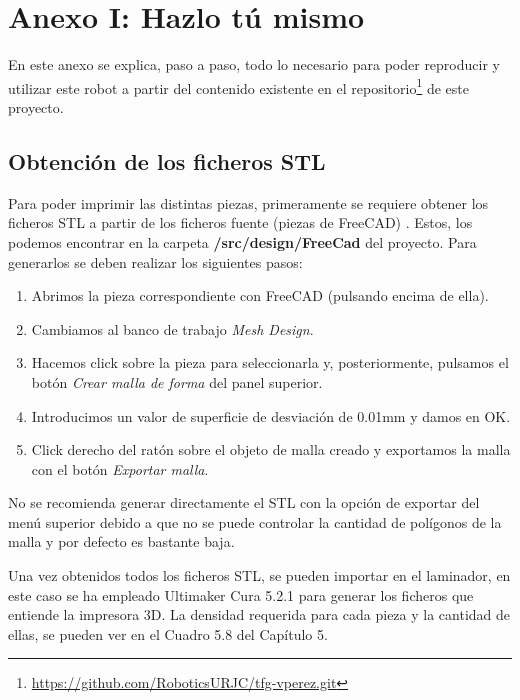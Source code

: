 \chapter*{Anexo I: Hazlo tú mismo}
\label{cap:anexoi}

\noindent En este anexo se explica, paso a paso, todo lo necesario para poder reproducir y utilizar este robot a partir del contenido 
existente en el repositorio\footnote{\url{https://github.com/RoboticsURJC/tfg-vperez.git}} de este proyecto.

\section*{Obtención de los ficheros STL}
\noindent Para poder imprimir las distintas piezas, primeramente se requiere obtener los ficheros STL a partir de los ficheros fuente (piezas de FreeCAD) . 
Estos, los podemos encontrar en la carpeta \textbf{/src/design/FreeCad} del proyecto. Para generarlos se deben realizar los siguientes pasos:
\begin{enumerate}
\item Abrimos la pieza correspondiente con FreeCAD (pulsando encima de ella).
\item Cambiamos al banco de trabajo \textit{Mesh Design}.
\item Hacemos click sobre la pieza para seleccionarla y, posteriormente, pulsamos el botón \textit{Crear malla de forma} del panel superior.
\item Introducimos un valor de superficie de desviación de 0.01mm y damos en OK.
\item Click derecho del ratón sobre el objeto de malla creado y exportamos la malla con el botón \textit{Exportar malla}. 
\end{enumerate}

\begin{tcolorbox}[colback=blue!5!white,colframe=blue!75!black,title=Nota]
    No se recomienda generar directamente el STL con la opción de exportar del menú superior debido a que no se puede controlar la cantidad de polígonos 
    de la malla y por defecto es bastante baja.
\end{tcolorbox}

Una vez obtenidos todos los ficheros STL, se pueden importar en el laminador, en este caso se ha empleado 
Ultimaker Cura 5.2.1 para generar los ficheros que entiende la impresora 3D. La densidad requerida para cada pieza 
y la cantidad de ellas, se pueden ver en el Cuadro 5.8 del Capítulo 5.


